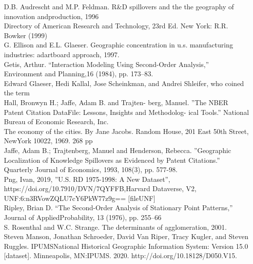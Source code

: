 \documentclass[12pt,letterpaper]{article}
\begin{document}
\noindent D.B. Audrescht and M.P. Feldman.  R\&D spillovers and the the geography of innovation andproduction, 1996\\
 
\noindent Directory of American Research and Technology, 23rd Ed. New York: R.R. Bowker (1999)\\

\noindent G. Ellison and E.L. Glaeser.   Geographic concentration in u.s.   manufacturing industries:  adartboard approach, 1997.\\

\noindent Getis, Arthur. “Interaction Modeling Using Second-Order Analysis,” Environment and Planning,16 (1984), pp. 173–83.\\

\noindent Edward Glaeser, Hedi Kallal, Jose Scheinkman, and Andrei Shleifer, who coined the term\\
 
\noindent Hall, Bronwyn H.; Jaffe, Adam B. and Trajten- berg, Manuel. ”The NBER Patent Citation DataFile: Lessons, Insights and Methodolog- ical Tools.” National Bureau of Economic Research, Inc.\\

\noindent The economy of the cities. By Jane Jacobs. Random House, 201 East 50th Street, NewYork 10022, 1969. 268 pp\\

\noindent Jaffe, Adam B.; Trajtenberg, Manuel and Henderson, Rebecca. ”Geographic Localization of Knowledge Spillovers as Evidenced by Patent Citations.” Quarterly Journal of Economics, 1993, 108(3), pp. 577-98.\\

\noindent Png, Ivan, 2019, ”U.S. RD 1975-1998: A New Dataset”, https://doi.org/10.7910/DVN/7QYFFB,Harvard Dataverse, V2, UNF:6:n3RVowZQLU7cY6PkW77z9g== [fileUNF]\\

\noindent Ripley, Brian D. “The Second-Order Analysis of Stationary Point Patterns,” Journal of AppliedProbability, 13 (1976), pp. 255–66\\

\noindent S. Rosenthal and W.C. Strange. The determinants of agglomeration, 2001.\\

\noindent Steven Manson, Jonathan Schroeder, David Van Riper, Tracy Kugler, and Steven Ruggles. IPUMSNational Historical Geographic Information System:  Version 15.0 [dataset].  Minneapolis, MN:IPUMS. 2020. http://doi.org/10.18128/D050.V15.
\end{document}
